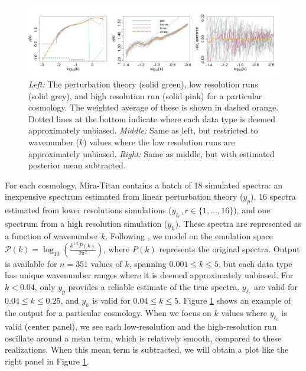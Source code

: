 \documentclass[11pt]{article}
\begin{document}
\begin{figure}[ht]
    \centering 
    \includegraphics[width=\linewidth]{plot_data.png}
    \caption{{\it Left:} The perturbation theory (solid green), low resolution runs (solid grey), 
    and high resolution run  (solid pink) for a particular cosmology. 
    The weighted average of these is shown in dashed orange. Dotted lines at the bottom 
    indicate where each data type is deemed approximately unbiased. 
    {\it Middle:} Same as left, but restricted to wavenumber ($k$) values where the low resolution 
    runs are approximately unbiased.
    {\it Right:} Same as middle, but with estimated posterior mean subtracted.}
    \label{fig:plot_data}
\end{figure}

For each cosmology, Mira-Titan contains a batch of 18 simulated spectra: an inexpensive 
spectrum estimated from linear perturbation theory ($y_p$), 16 spectra estimated from 
lower resolutions simulations ($y_{\ell_r}, r \in \{1,\dots,16\}$), and one spectrum from 
a high resolution simulation ($y_h$). 
These spectra are represented as a function of wavenumber $k$.  Following 
\cite{moran2023mira}, we model on the emulation space 
$\mathcal{P}(k)=\log_{10}\left(\frac{k^{1.5}P(k)}{2\pi^2}\right)$, where $P(k)$ represents the
original spectra. Output is available for $n=351$ values of $k$, spanning
$0.001 \leq k \leq 5$, but each data type has unique wavenumber ranges
where it is deemed approximately unbiased. For $k<0.04$, only $y_p$ provides a reliable 
estimate of the true spectra. $y_{\ell_r}$ are valid for $0.04 \leq k \leq 0.25$, and 
$y_h$ is valid for $0.04 \leq k \leq 5$.  Figure \ref{fig:plot_data} shows an example 
of the output for a particular cosmology. When we focus on $k$ values where $y_{\ell_r}$ 
is valid (center panel), we see each low-resolution and the high-resolution run oscillate around 
a mean term, which is relatively smooth, compared to these realizations. When this
mean term is subtracted, we will obtain a plot like the right panel in 
Figure \ref{fig:plot_data}.
\end{document}
